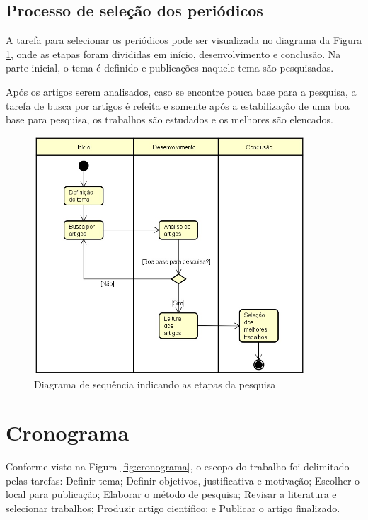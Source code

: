 \documentclass[smallextended]{svjour3}       %
\begin{document}
\subsection{Processo de seleção dos periódicos}
\label{sec:3}

A tarefa para selecionar os periódicos pode ser visualizada no diagrama da Figura \ref{fig:diagrama}, onde as etapas foram divididas em início, desenvolvimento e conclusão. Na parte inicial, o tema é definido e publicações naquele tema são pesquisadas. 

Após os artigos serem analisados, caso se encontre pouca base para a pesquisa, a tarefa de busca por artigos é refeita e somente após a estabilização de uma boa base para pesquisa, os trabalhos são estudados e os melhores são elencados.

\begin{figure}[!ht]
	\centering
	\includegraphics[width=0.9\textwidth]{imagens/diagrama.jpg}
	\caption{Diagrama de sequência indicando as etapas da pesquisa}
	\label{fig:diagrama}
\end{figure}

\section{Cronograma}
\label{sec:4}

Conforme visto na Figura \ref{fig:cronograma}, o escopo do trabalho foi delimitado pelas tarefas: Definir tema; Definir objetivos, justificativa e motivação; Escolher o local para publicação; Elaborar o método de pesquisa; Revisar a literatura e selecionar trabalhos; Produzir artigo científico; e Publicar o artigo finalizado. 
\end{document}
